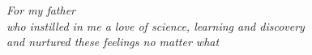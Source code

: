 \begin{titlepage}
\begin{flushleft}
    \end{flushleft}

    \clearpage

    \begin{center}
        \vspace*{\fill}
        \emph{For my father\\
            who instilled in me a love of science, learning and discovery\\
            and nurtured these feelings no matter what}
        \vspace*{6cm}
        \vspace*{\fill}
    \end{center}

    \clearpage
    \thispagestyle{empty}
    \null
    \clearpage

    
\end{titlepage}